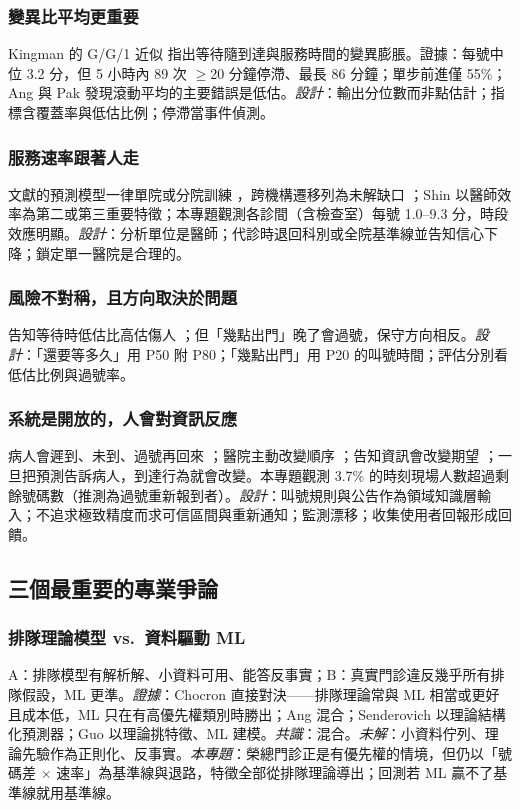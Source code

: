 \documentclass[11pt,twocolumn]{article}
\begin{document}
\subsubsection{變異比平均更重要}
Kingman 的 G/G/1 近似 \cite{hopp2011} 指出等待隨到達與服務時間的變異膨脹。證據：每號中位 3.2 分，但 5 小時內 89 次 $\geq$20 分鐘停滯、最長 86 分鐘；單步前進僅 55\%；Ang \cite{ang2016} 與 Pak \cite{pak2021} 發現滾動平均的主要錯誤是低估。\textit{設計}：輸出分位數而非點估計；指標含覆蓋率與低估比例；停滯當事件偵測。

\subsubsection{服務速率跟著人走}
文獻的預測模型一律單院或分院訓練 \cite{ang2016,shin2024,guo2025,liu2026}，跨機構遷移列為未解缺口 \cite{toffaha2025}；Shin \cite{shin2024} 以醫師效率為第二或第三重要特徵；本專題觀測各診間（含檢查室）每號 1.0--9.3 分，時段效應明顯。\textit{設計}：分析單位是醫師；代診時退回科別或全院基準線並告知信心下降；鎖定單一醫院是合理的。

\subsubsection{風險不對稱，且方向取決於問題}
告知等待時低估比高估傷人 \cite{shin2024,pak2021,zhang2023}；但「幾點出門」晚了會過號，保守方向相反。\textit{設計}：「還要等多久」用 P50 附 P80；「幾點出門」用 P20 的叫號時間；評估分別看低估比例與過號率。

\subsubsection{系統是開放的，人會對資訊反應}
病人會遲到、未到、過號再回來 \cite{toffaha2025}；醫院主動改變順序 \cite{vghtpe2025}；告知資訊會改變期望 \cite{zhang2023}；一旦把預測告訴病人，到達行為就會改變。本專題觀測 3.7\% 的時刻現場人數超過剩餘號碼數（推測為過號重新報到者）。\textit{設計}：叫號規則與公告作為領域知識層輸入；不追求極致精度而求可信區間與重新通知；監測漂移；收集使用者回報形成回饋。

\subsection{三個最重要的專業爭論}
\subsubsection{排隊理論模型 vs.\ 資料驅動 ML}
A：排隊模型有解析解、小資料可用、能答反事實；B：真實門診違反幾乎所有排隊假設，ML 更準。\textit{證據}：Chocron \cite{chocron2022} 直接對決——排隊理論常與 ML 相當或更好且成本低，ML 只在有高優先權類別時勝出；Ang \cite{ang2016} 混合；Senderovich \cite{senderovich2015} 以理論結構化預測器；Guo \cite{guo2025} 以理論挑特徵、ML 建模。\textit{共識}：混合。\textit{未解}：小資料佇列、理論先驗作為正則化、反事實。\textit{本專題}：榮總門診正是有優先權的情境，但仍以「號碼差 $\times$ 速率」為基準線與退路，特徵全部從排隊理論導出；回測若 ML 贏不了基準線就用基準線。
\end{document}
